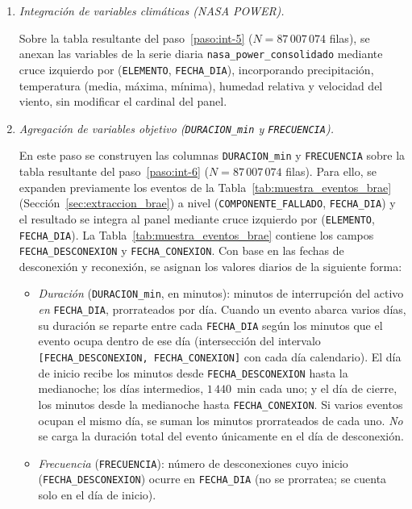 {\begin{enumerate}
        \item\label{paso:int-6} \textit{Integración de variables climáticas (NASA POWER).}\mbox{}\par\vspace{0.2em}\noindent
        Sobre la tabla resultante del paso~\ref{paso:int-5} ($N = 87\,007\,074$ filas), se anexan las variables de la serie diaria \texttt{nasa\_power\_consolidado} mediante cruce izquierdo por (\texttt{ELEMENTO}, \texttt{FECHA\_DIA}), incorporando precipitación, temperatura (media, máxima, mínima), humedad relativa y velocidad del viento, sin modificar el cardinal del panel.
    
        \item\label{paso:int-7} \textit{Agregación de variables objetivo (\texttt{DURACION\_min} y \texttt{FRECUENCIA}).}\mbox{}\par\vspace{0.2em}\noindent
        En este paso se construyen las columnas \texttt{DURACION\_min} y \texttt{FRECUENCIA} sobre la tabla resultante del paso~\ref{paso:int-6} ($N = 87\,007\,074$ filas). Para ello, se expanden previamente los eventos de la Tabla~\ref{tab:muestra_eventos_brae} (Sección~\ref{sec:extraccion_brae}) a nivel (\texttt{COMPONENTE\_FALLADO}, \texttt{FECHA\_DIA}) y el resultado se integra al panel mediante cruce izquierdo por (\texttt{ELEMENTO}, \texttt{FECHA\_DIA}). La Tabla~\ref{tab:muestra_eventos_brae} contiene los campos \texttt{FECHA\_DESCONEXION} y \texttt{FECHA\_CONEXION}. Con base en las fechas de desconexión y reconexión, se asignan los valores diarios de la siguiente forma:
        \begin{itemize}
            \item \textit{Duración} (\texttt{DURACION\_min}, en minutos): minutos de interrupción del activo \textit{en} \texttt{FECHA\_DIA}, prorrateados por día. Cuando un evento abarca varios días, su duración se reparte entre cada \texttt{FECHA\_DIA} según los minutos que el evento ocupa dentro de ese día (intersección del intervalo \texttt{[FECHA\_DESCONEXION, FECHA\_CONEXION]} con cada día calendario). El día de inicio recibe los minutos desde \texttt{FECHA\_DESCONEXION} hasta la medianoche; los días intermedios, $1\,440$~min cada uno; y el día de cierre, los minutos desde la medianoche hasta \texttt{FECHA\_CONEXION}. Si varios eventos ocupan el mismo día, se suman los minutos prorrateados de cada uno. \textit{No} se carga la duración total del evento únicamente en el día de desconexión.
            \item \textit{Frecuencia} (\texttt{FRECUENCIA}): número de desconexiones cuyo inicio (\texttt{FECHA\_DESCONEXION}) ocurre en \texttt{FECHA\_DIA} (no se prorratea; se cuenta solo en el día de inicio).

\end{itemize}
\end{enumerate}}

